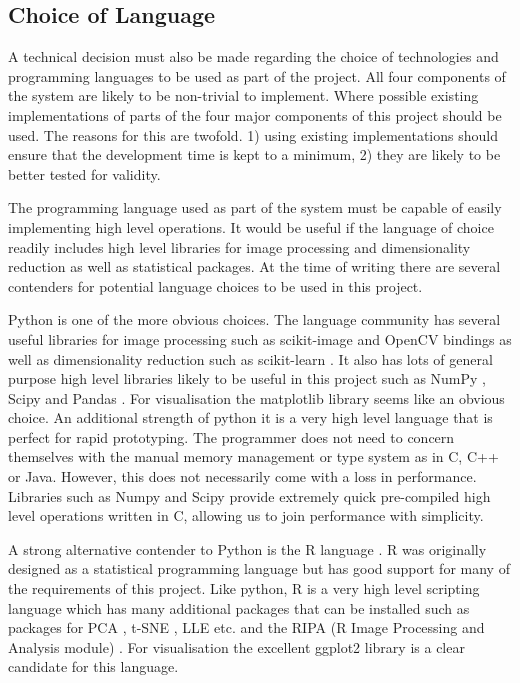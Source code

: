 \subsection{Choice of Language}
A technical decision must also be made regarding the choice of technologies and programming languages to be used as part of the project. All four components of the system are likely to be non-trivial to implement. Where possible existing implementations of parts of the four major components of this project should be used. The reasons for this are twofold. 1) using existing implementations should ensure that the development time is kept to a minimum, 2) they are likely to be better tested for validity. 

The programming language used as part of the system must be capable of easily implementing high level operations. It would be useful if the language of choice readily includes high level libraries for image processing and dimensionality reduction as well as statistical packages. At the time of writing there are several contenders for potential language choices to be used in this project. 

Python \cite{pythonLanguage} is one of the more obvious choices. The language community has several useful libraries for image processing such as scikit-image \cite{van2014scikit} and OpenCV bindings \cite{openCV} as well as dimensionality reduction such as scikit-learn \cite{pedregosa2011scikit}. It also has lots of general purpose high level libraries likely to be useful in this project such as NumPy \cite{pythonNumpy}, Scipy \cite{pythonSciPy} and Pandas \cite{pythonPandas}. For visualisation the matplotlib library seems like an obvious choice. An additional strength of python it is a very high level language that is perfect for rapid prototyping. The programmer does not need to concern themselves with the manual memory management or type system as in C, C++ or Java. However, this does not necessarily come with a loss in performance. Libraries such as Numpy and Scipy provide extremely quick pre-compiled high level operations written in C, allowing us to join performance with simplicity.

A strong alternative contender to Python is the R language \cite{rlanguage}. R was originally designed as a statistical programming language but has good support for many of the requirements of this project. Like python, R is a very high level scripting language which has many additional packages that can be installed such as packages for PCA \cite{rPCA}, t-SNE \cite{rtSNE}, LLE \cite{rLLE} etc. and the RIPA (R Image Processing and Analysis module) \cite{rRIPA}. For visualisation the excellent ggplot2 \cite{rggplot2} library is a clear candidate for this language.


